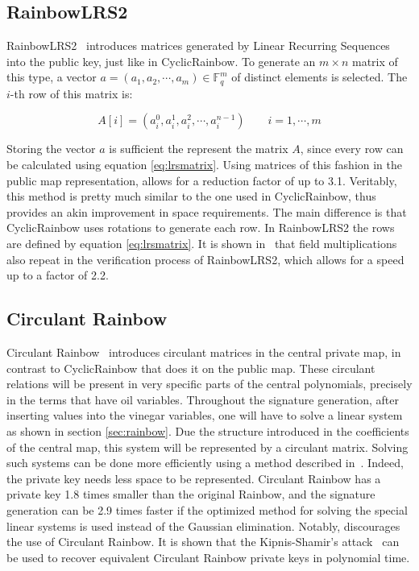 \documentclass{ufsctex/ufsctex}
\begin{document}
\subsection{RainbowLRS2}

RainbowLRS2~\cite{petzoldt2013thesis} introduces matrices generated by Linear
Recurring Sequences into the public key, just like in CyclicRainbow. To
generate an $m \times n$ matrix of this type, a vector $a = (a_1, a_2, \cdots,
a_m) \in \mathbb{F}_q^m$ of distinct elements is selected. The $i$-th row of
this matrix is:

\begin{equation}\label{eq:lrsmatrix}
A[i] = (a_i^0, a_i^1, a_i^2, \cdots, a_i^{n-1}) \qquad i = 1, \cdots, m
\end{equation}

Storing the vector $a$ is sufficient the represent the matrix $A$, since every
row can be calculated using equation \ref{eq:lrsmatrix}. Using matrices of this
fashion in the public map representation, allows for a reduction factor of up
to 3.1. Veritably, this method is pretty much similar to the one used in
CyclicRainbow, thus provides an akin improvement in space requirements. The
main difference is that CyclicRainbow uses rotations to generate each row. In
RainbowLRS2 the rows are defined by equation \ref{eq:lrsmatrix}. It is shown
in~\cite{petzoldt2013thesis} that field multiplications also repeat in the
verification process of RainbowLRS2, which allows for a speed up to a factor of
2.2.

\subsection{Circulant Rainbow}

Circulant Rainbow~\cite{peng2017circulant} introduces circulant matrices in the
central private map, in contrast to CyclicRainbow that does it on the public
map. These circulant relations will be present in very specific parts of the
central polynomials, precisely in the terms that have oil variables. Throughout
the signature generation, after inserting values into the vinegar variables,
one will have to solve a linear system as shown in section \ref{sec:rainbow}.
Due the structure introduced in the coefficients of the central map, this
system will be represented by a circulant matrix. Solving such systems can be
done more efficiently using a method described in~\cite{peng2017circulant}.
Indeed, the private key needs less space to be represented. Circulant Rainbow
has a private key 1.8 times smaller than the original Rainbow, and the
signature generation can be 2.9 times faster if the optimized method for
solving the special linear systems is used instead of the Gaussian elimination.
Notably, \cite{hashimoto2018security} discourages the use of Circulant Rainbow.
It is shown that the Kipnis-Shamir's attack~\cite{kipnis1998cryptanalysis} can
be used to recover equivalent Circulant Rainbow private keys in polynomial
time.
\end{document}
